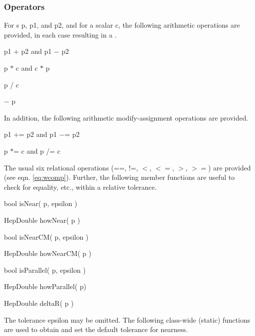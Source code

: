 \subsubsection{Operators}

For \LV s p, p1, and p2, and for a scalar c,
the following arithmetic operations are provided,
in each case resulting in a \LV .

\begin{shortlist}
  \item p1 + p2  and  p1 $-$ p2
  \item p $*$ c  and  c $*$ p
  \item p / c
  \item $-$ p
\end{shortlist}

\noindent
In addition, the following arithmetic modify-assignment operations are provided.

\begin{shortlist}
  \item p1 += p2  and  p1 $-$= p2
  \item p $*$= c  and  p /= c
\end{shortlist}

The usual six relational operations
(==, !=, $<$, $<=$, $>$, $>=$) are provided (see eqn. \ref{eq:wcomp}).
Further, the following member functions are useful
to check for equality, etc., within a relative tolerance.

\begin{shortlist}
  \item bool isNear( p, epsilon ) \see{\ref{eq:wisNear}}
  \item HepDouble howNear( p ) \see{\ref{eq:whowNear}, \ref{eq:whowNear:2}}
  \item bool isNearCM( p, epsilon ) \see{\ref{eq:wisNearCM}, \ref{eq:wisNearCM:2}}
  \item HepDouble howNearCM( p ) \see{\ref{eq:whowNearCM}, \ref{eq:whowNearCM:2}}
  \item bool isParallel( p, epsilon ) \see{\ref{eq:wisPar}, \ref{eq:wisPar:2}}
  \item HepDouble howParallel( p) \see{\ref{eq:whowPar}, \ref{eq:whowPar:2}}
  \item HepDouble deltaR( p ) \see{\ref{eq:deltaR}}
\end{shortlist}

\noindent
The tolerance epsilon may be omitted.
The following class-wide (static) functions are used
to obtain and set the default tolerance for nearness.

